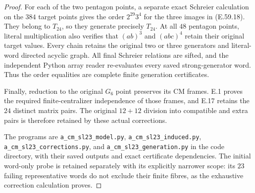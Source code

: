 \begin{proof}
For each of the two pentagon points, a separate exact Schreier
calculation on the $384$ target points gives the order
$2^{29}3^4$ for the three images in \textup{(E.59.18)}.
They belong to $T_{24}$, so they generate precisely $T_{24}$.
At all $48$ pentagon points, literal multiplication also verifies
that $(ab)^3$ and $(abc)^4$ retain their original target values.
Every chain retains the original two or three generators and
literal-word directed acyclic graph. All final Schreier relations
are sifted, and the independent Python array reader re-evaluates
every saved strong-generator word. Thus the order equalities
are complete finite generation certificates.

Finally, reduction to the original $G_6$ point preserves its
CM frames. E.1 proves the required finite-centralizer independence
of those frames, and E.17 retains the $24$ distinct matrix pairs.
The original $12+12$ division into compatible and extra pairs is
therefore retained by these actual corrections.

The programs are \texttt{a\_cm\_sl23\_model.py},
\texttt{a\_cm\_sl23\_induced.py},
\texttt{a\_cm\_sl23\_corrections.py}, and
\texttt{a\_cm\_sl23\_generation.py} in the code directory,
with their saved outputs and exact certificate dependencies.
The initial word-only probe is retained separately with its
explicitly narrower scope: its $23$ failing representative words
do not exclude their finite fibres, as the exhaustive correction
calculation proves.
\end{proof}
